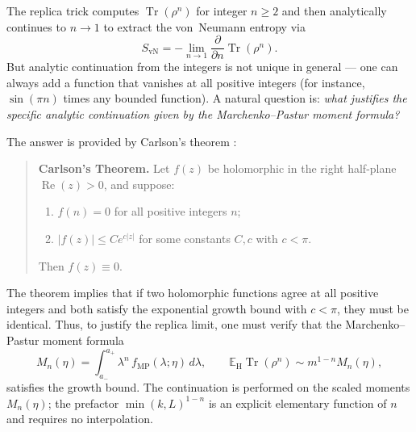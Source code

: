 \documentclass[11pt,letterpaper]{article}
\theoremstyle{plain}
\theoremstyle{definition}
\theoremstyle{remark}
\begin{document}
The replica trick computes $\operatorname{Tr}(\rho^n)$ for integer
$n \geq 2$ and then analytically continues to $n \to 1$ to extract the
von~Neumann entropy via
\begin{equation}
  S_{\mathrm{vN}} = -\lim_{n \to 1}
    \frac{\partial}{\partial n}\operatorname{Tr}(\rho^n).
  \label{eq07:replica_limit}
\end{equation}
But analytic continuation from the integers is not unique in general ---
one can always add a function that vanishes at all positive integers (for
instance, $\sin(\pi n)$ times any bounded function).  A natural question
is: \emph{what justifies the specific analytic continuation given by the
Marchenko--Pastur moment formula?}

The answer is provided by Carlson's theorem \cite{carlson1914}:

\begin{quote}
\textbf{Carlson's Theorem.}\quad
Let $f(z)$ be holomorphic in the right half-plane
$\operatorname{Re}(z) > 0$, and suppose:
\begin{enumerate}
  \item[(i)] $f(n) = 0$ for all positive integers $n$;
  \item[(ii)] $|f(z)| \leq C e^{c|z|}$ for some constants $C, c$ with
    $c < \pi$.
\end{enumerate}
Then $f(z) \equiv 0$.
\end{quote}

The theorem implies that if two holomorphic functions agree at all
positive integers and both satisfy the exponential growth bound with
$c < \pi$, they must be identical.  Thus, to justify the replica limit,
one must verify that the Marchenko--Pastur moment formula
\begin{equation}
  M_n(\eta)
  = \int_{a_-}^{a_+} \lambda^n \, f_{\mathrm{MP}}(\lambda;\eta)\, d\lambda,
  \qquad
  \mathbb E_{\mathrm H}\operatorname{Tr}(\rho^n)\sim m^{1-n}M_n(\eta),
  \label{eq07:mp_moments}
\end{equation}
satisfies the growth bound.  The continuation is performed on the
scaled moments $M_n(\eta)$; the prefactor $\min(k,L)^{1-n}$ is an
explicit elementary function of $n$ and requires no interpolation.
\end{document}
